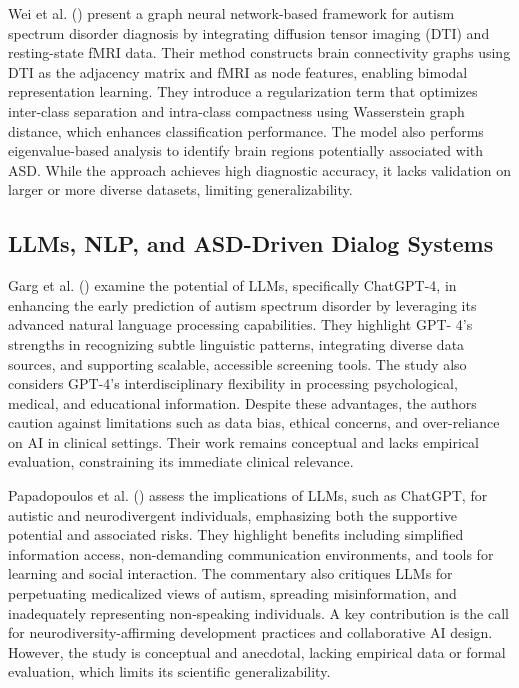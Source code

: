 \documentclass[pdflatex,sn-basic]{sn-jnl}%
\theoremstyle{thmstyleone}%
\theoremstyle{thmstyletwo}%
\theoremstyle{thmstylethree}%
\begin{document}
  Wei et al. (\cite{wei_autistic_2023})  present a graph neural network-based framework for autism spectrum disorder diagnosis by
  integrating diffusion tensor imaging (DTI) and resting-state fMRI data. Their method constructs brain connectivity graphs using
  DTI as the adjacency matrix and fMRI as node features, enabling bimodal representation learning. They introduce a
  regularization term that optimizes inter-class separation and intra-class compactness using Wasserstein graph distance, which
  enhances classification performance. The model also performs eigenvalue-based analysis to identify brain regions potentially
  associated with ASD. While the approach achieves high diagnostic accuracy, it lacks validation on larger or more diverse
  datasets, limiting generalizability.

  \subsection{LLMs, NLP, and ASD-Driven Dialog Systems}

  Garg et al. (\cite{garg_insights_2024}) examine the potential of LLMs, specifically ChatGPT-4, in enhancing the early
  prediction of autism spectrum disorder by leveraging its advanced natural language processing capabilities. They highlight GPT-
  4’s strengths in recognizing subtle linguistic patterns, integrating diverse data sources, and supporting scalable, accessible
  screening tools. The study also considers GPT-4’s interdisciplinary flexibility in processing psychological, medical, and
  educational information. Despite these advantages, the authors caution against limitations such as data bias, ethical concerns,
  and over-reliance on AI in clinical settings. Their work remains conceptual and lacks empirical evaluation, constraining its
  immediate clinical relevance.

  Papadopoulos et al. (\cite{papadopoulos_large_2024})  assess the implications of LLMs, such as ChatGPT, for autistic and
  neurodivergent individuals, emphasizing both the supportive potential and associated risks. They highlight benefits including
  simplified information access, non-demanding communication environments, and tools for learning and social interaction. The
  commentary also critiques LLMs for perpetuating medicalized views of autism, spreading misinformation, and inadequately
  representing non-speaking individuals. A key contribution is the call for neurodiversity-affirming development practices and
  collaborative AI design. However, the study is conceptual and anecdotal, lacking empirical data or formal evaluation, which
  limits its scientific generalizability.
\end{document}
